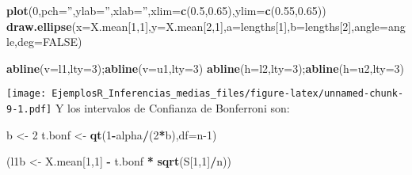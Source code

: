 \documentclass[
]{article}
\newenvironment{Shaded}{\begin{snugshade}}{\end{snugshade}}
\newcommand{\DataTypeTok}[1]{\textcolor[rgb]{0.13,0.29,0.53}{#1}}
\newcommand{\DecValTok}[1]{\textcolor[rgb]{0.00,0.00,0.81}{#1}}
\newcommand{\FloatTok}[1]{\textcolor[rgb]{0.00,0.00,0.81}{#1}}
\newcommand{\KeywordTok}[1]{\textcolor[rgb]{0.13,0.29,0.53}{\textbf{#1}}}
\newcommand{\NormalTok}[1]{#1}
\newcommand{\OperatorTok}[1]{\textcolor[rgb]{0.81,0.36,0.00}{\textbf{#1}}}
\newcommand{\OtherTok}[1]{\textcolor[rgb]{0.56,0.35,0.01}{#1}}
\newcommand{\StringTok}[1]{\textcolor[rgb]{0.31,0.60,0.02}{#1}}
\begin{document}
\begin{Shaded}
\begin{Highlighting}[]
\KeywordTok{plot}\NormalTok{(}\DecValTok{0}\NormalTok{,}\DataTypeTok{pch=}\StringTok{''}\NormalTok{,}\DataTypeTok{ylab=}\StringTok{''}\NormalTok{,}\DataTypeTok{xlab=}\StringTok{''}\NormalTok{,}\DataTypeTok{xlim=}\KeywordTok{c}\NormalTok{(}\FloatTok{0.5}\NormalTok{,}\FloatTok{0.65}\NormalTok{),}\DataTypeTok{ylim=}\KeywordTok{c}\NormalTok{(}\FloatTok{0.55}\NormalTok{,}\FloatTok{0.65}\NormalTok{))}
\KeywordTok{draw.ellipse}\NormalTok{(}\DataTypeTok{x=}\NormalTok{X.mean[}\DecValTok{1}\NormalTok{,}\DecValTok{1}\NormalTok{],}\DataTypeTok{y=}\NormalTok{X.mean[}\DecValTok{2}\NormalTok{,}\DecValTok{1}\NormalTok{],}\DataTypeTok{a=}\NormalTok{lengths[}\DecValTok{1}\NormalTok{],}\DataTypeTok{b=}\NormalTok{lengths[}\DecValTok{2}\NormalTok{],}\DataTypeTok{angle=}\NormalTok{angle,}\DataTypeTok{deg=}\OtherTok{FALSE}\NormalTok{)}

\KeywordTok{abline}\NormalTok{(}\DataTypeTok{v=}\NormalTok{l1,}\DataTypeTok{lty=}\DecValTok{3}\NormalTok{);}\KeywordTok{abline}\NormalTok{(}\DataTypeTok{v=}\NormalTok{u1,}\DataTypeTok{lty=}\DecValTok{3}\NormalTok{)}
\KeywordTok{abline}\NormalTok{(}\DataTypeTok{h=}\NormalTok{l2,}\DataTypeTok{lty=}\DecValTok{3}\NormalTok{);}\KeywordTok{abline}\NormalTok{(}\DataTypeTok{h=}\NormalTok{u2,}\DataTypeTok{lty=}\DecValTok{3}\NormalTok{)}
\end{Highlighting}
\end{Shaded}

\texttt{[image: EjemplosR\_Inferencias\_medias\_files/figure-latex/unnamed-chunk-9-1.pdf]}
Y los intervalos de Confianza de Bonferroni son:

\begin{Shaded}
\begin{Highlighting}[]
\NormalTok{b <-}\StringTok{ }\DecValTok{2}
\NormalTok{t.bonf <-}\StringTok{ }\KeywordTok{qt}\NormalTok{(}\DecValTok{1}\OperatorTok{-}\NormalTok{alpha}\OperatorTok{/}\NormalTok{(}\DecValTok{2}\OperatorTok{*}\NormalTok{b),}\DataTypeTok{df=}\NormalTok{n}\DecValTok{-1}\NormalTok{)}

\NormalTok{(l1b <-}\StringTok{ }\NormalTok{X.mean[}\DecValTok{1}\NormalTok{,}\DecValTok{1}\NormalTok{] }\OperatorTok{-}\StringTok{ }\NormalTok{t.bonf }\OperatorTok{*}\StringTok{ }\KeywordTok{sqrt}\NormalTok{(S[}\DecValTok{1}\NormalTok{,}\DecValTok{1}\NormalTok{]}\OperatorTok{/}\NormalTok{n))}
\end{Highlighting}
\end{Shaded}
\end{document}
